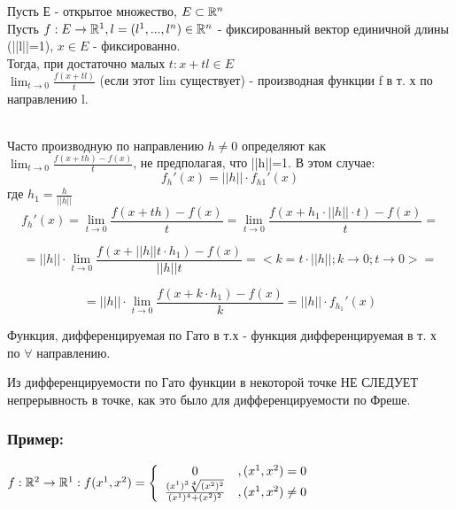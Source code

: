 \begin{opred}
Пусть Е - открытое множество, $E\subset\mathbb{R}^n$
\\
Пусть $f:E\to\mathbb{R}^1,l=(l^1,...,l^n)\in\mathbb{R}^n$ - фиксированный вектор единичной длины (||l||=1), $x\in E$ - фиксированно.
\\
Тогда, при достаточно малых $t:x+tl\in E$
\\
$\lim_{t\to 0}\frac{f(x+tl)}{t}$ (если этот lim существует) - производная функции f в т. х по направлению l.
\end{opred}
\\
Часто производную по направлению $h\ne 0$ определяют как $\lim_{t\to 0} \frac{f(x+th)-f(x)}{t}$, не предполагая, что ||h||=1. В этом случае:
$$
f_h'(x)=||h||\cdot f_{h1}'(x)
$$
где $h_1=\frac{h}{||h||}$
\\
\dokvo
$$
f_h'(x)=\lim_{t\to 0}\frac{f(x+th)-f(x)}{t}=\lim_{t\to 0}\frac{f(x+h_1\cdot||h||\cdot t)-f(x)}{t}=
$$

$$
=||h||\cdot\lim_{t\to 0}\frac{f(x+||h||t\cdot h_1)-f(x)}{||h||t}=<k=t\cdot ||h||;k\to 0; t\to 0>=
$$

$$
=||h||\cdot\lim_{t\to 0}\frac{f(x+k\cdot h_1)-f(x)}{k}=||h||\cdot f_{h_1}'(x)
$$
\dokno

\begin{opred}
Функция, дифференцируемая по Гато в т.х - функция дифференцируемая в т. х по $\forall$ направлению.
\end{opred}

Из дифференцируемости по Гато функции в некоторой точке НЕ СЛЕДУЕТ непрерывность в точке, как это было для дифференцируемости по Фреше.
\subsubsection{Пример:}

$f:\mathbb{R}^2\to\mathbb{R}^1:f(x^1,x^2) = 
\left\{\begin{array}{c c}
0 & ,(x^1,x^2)=0 \\
\frac{(x^1)^3 \sqrt[4]{(x^2)^2}}{(x^1)^4+(x^2)^2} & ,(x^1,x^2)\ne 0
\end{array}\right.$

